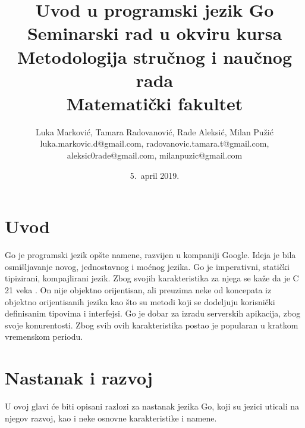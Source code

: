 \documentclass[a4paper]{article}
\begin{document}
\title{Uvod u programski jezik Go\\ \small{Seminarski rad u okviru kursa\\Metodologija stručnog i naučnog rada\\ Matematički fakultet}}

\author{Luka Marković, Tamara Radovanović, Rade Aleksić, Milan Pužić\\ luka.markovic.d@gmail.com, radovanovic.tamara.t@gmail.com,\\ aleksic0rade@gmail.com, milanpuzic@gmail.com
}

\date{5.~april 2019.}

\maketitle



\tableofcontents

\newpage

\section{Uvod}
\label{sec:uvod}

Go je programski jezik opšte namene, razvijen u kompaniji Google. Ideja je bila osmišljavanje novog, jednostavnog i moćnog jezika. Go je imperativni, statički tipizirani, kompajlirani jezik. Zbog svojih karakteristika za njega se kaže da je C 21 veka \cite{TheWaytoGo}. On nije objektno orijentisan, ali preuzima neke od koncepata iz objektno orijentisanih jezika kao što su metodi koji se dodeljuju korisnički definisanim tipovima i interfejsi. Go je dobar za izradu serverskih apikacija, zbog svoje konurentosti. Zbog svih ovih karakteristika postao je popularan u kratkom vremenskom periodu. 

\section{Nastanak i razvoj}
\label{sec:nastanak_i_razvoj}

U ovoj glavi će biti opisani razlozi za nastanak jezika Go, koji su jezici uticali na njegov razvoj, kao i neke osnovne karakteristike i namene.
\end{document}
